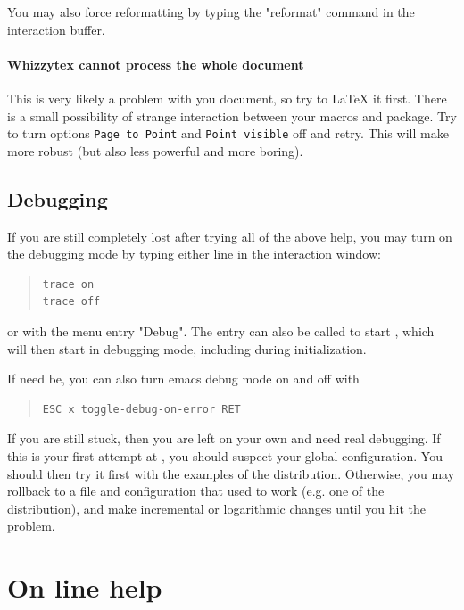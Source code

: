 \documentclass[12pt]{article}
\begin{document}
You may also force reformatting by typing the \lst"reformat" command
in the interaction buffer. 


\paragraph {Whizzytex cannot process the whole document}

This is very likely a problem with you document, so try to {\LaTeX} it 
first. There is a small possibility of strange interaction between
your macros and {\whizzy} package. Try to turn options 
{\tt Page to Point} and {\tt Point visible} off and retry. 
This will make {\whizzy} more robust (but also less powerful and more
boring). 

\subsection {Debugging}

If you are still completely lost after trying all of the above help, you may
turn on the debugging mode by typing either line in the interaction window:
\begin{quote}
\begin{verbatim}
trace on
trace off
\end{verbatim}
\end{quote}
or with the menu entry \lst"Debug".
The entry can also be called to start {\whizzy}, which will then start in 
debugging mode, including during initialization. 

If need be, you can also turn emacs debug mode on and off with
\begin{quote}
\begin{verbatim}
ESC x toggle-debug-on-error RET
\end{verbatim}
\end{quote}

If you are still stuck, then you are left on your own and need real
debugging.  If this is your first attempt at {\whizzy}, you should suspect
your global configuration. You should then try it first with the examples of
the distribution.  Otherwise, you may rollback to a file and configuration
that used to work (e.g. one of the distribution), and make incremental or
logarithmic changes until you hit the problem. 

\section{On line help}
\end{document}
